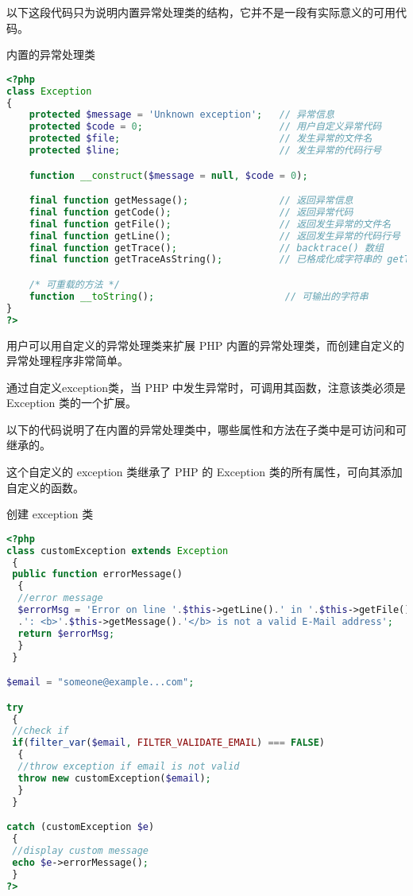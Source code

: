 以下这段代码只为说明内置异常处理类的结构，它并不是一段有实际意义的可用代码。

\begin{example}
内置的异常处理类
\begin{lstlisting}[language=PHP]
<?php
class Exception
{
    protected $message = 'Unknown exception';   // 异常信息
    protected $code = 0;                        // 用户自定义异常代码
    protected $file;                            // 发生异常的文件名
    protected $line;                            // 发生异常的代码行号

    function __construct($message = null, $code = 0);

    final function getMessage();                // 返回异常信息
    final function getCode();                   // 返回异常代码
    final function getFile();                   // 返回发生异常的文件名
    final function getLine();                   // 返回发生异常的代码行号
    final function getTrace();                  // backtrace() 数组
    final function getTraceAsString();          // 已格成化成字符串的 getTrace() 信息

    /* 可重载的方法 */
    function __toString();                       // 可输出的字符串
}
?>
\end{lstlisting}
\end{example}


用户可以用自定义的异常处理类来扩展 PHP 内置的异常处理类，而创建自定义的异常处理程序非常简单。

通过自定义exception类，当 PHP 中发生异常时，可调用其函数，注意该类必须是 Exception 类的一个扩展。

以下的代码说明了在内置的异常处理类中，哪些属性和方法在子类中是可访问和可继承的。


这个自定义的 exception 类继承了 PHP 的 Exception 类的所有属性，可向其添加自定义的函数。


\begin{example}
创建 exception 类
\begin{lstlisting}[language=PHP]
<?php
class customException extends Exception
 {
 public function errorMessage()
  {
  //error message
  $errorMsg = 'Error on line '.$this->getLine().' in '.$this->getFile()
  .': <b>'.$this->getMessage().'</b> is not a valid E-Mail address';
  return $errorMsg;
  }
 }

$email = "someone@example...com";

try
 {
 //check if 
 if(filter_var($email, FILTER_VALIDATE_EMAIL) === FALSE)
  {
  //throw exception if email is not valid
  throw new customException($email);
  }
 }

catch (customException $e)
 {
 //display custom message
 echo $e->errorMessage();
 }
?>
\end{lstlisting}
\end{example}

